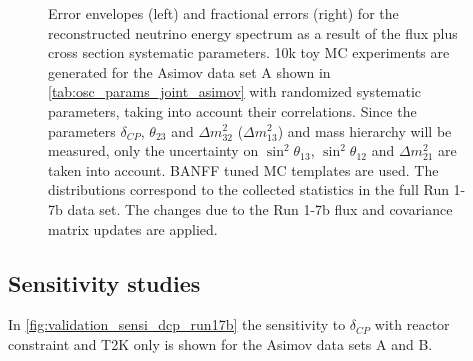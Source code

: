 \begin{figure}[htb]
\caption {
Error envelopes (left) and fractional errors (right) for the reconstructed neutrino energy spectrum
as a result of the flux plus cross section systematic parameters. 
10k toy MC experiments are generated for the Asimov data set A shown in \cref{tab:osc_params_joint_asimov}
with randomized systematic parameters, taking into account their correlations.
Since the parameters $\delta_{CP}$, $\theta_{23}$ and $\Delta m^2_{32}$ ($\Delta m^2_{13}$) and mass hierarchy
will be measured,
only the uncertainty on 
$\sin^2 \theta_{13}$,
$\sin^2 \theta_{12}$
and 
$\Delta m^2_{21}$ 
are taken into account.
BANFF tuned MC templates are used. 
The distributions correspond to the collected statistics in the full Run 1-7b data set.
The changes due to the Run 1-7b flux and covariance matrix updates are applied.
}
\label{fig:flux_xsec_envelope_Asimov_A_run17b}
\end{figure}




\clearpage












%
% 

\subsection{Sensitivity studies}
\label{sec:sensi_run17b}

In \cref{fig:validation_sensi_dcp_run17b} the sensitivity to $\delta_{CP}$ 
with reactor constraint and T2K only is shown for the Asimov data sets A and B.

